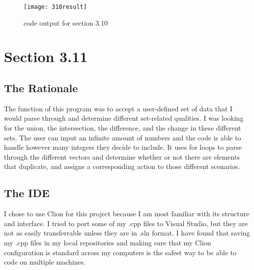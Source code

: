 \documentclass[11pt]{article}
\begin{document}
\begin{figure}[h]
    \centering
    \texttt{[image: 310result]}
    \caption{code output for section 3.10}
    \label{fig:my_label}
\end{figure}

\section*{Section 3.11}
\subsection*{The Rationale}
The function of this program was to accept a user-defined set of data that I would parse through and determine different set-related qualities. I was looking for the union, the intersection, the difference, and the change in these different sets. The user can input an infinite amount of numbers and the code is able to handle however many integers they decide to include. It uses for loops to parse through the different vectors and determine whether or not there are elements that duplicate, and assigns a corresponding action to those different scenarios. 

\subsection*{The IDE}
I chose to use Clion for this project because I am most familiar with its structure and interface. I tried to port some of my .cpp files to Visual Studio, but they are not as easily transferrable unless they are in .sln format. I have found that saving my .cpp files in my local repositories and making sure that my Clion configuration is standard across my computers is the safest way to be able to code on multiple machines.
\end{document}
